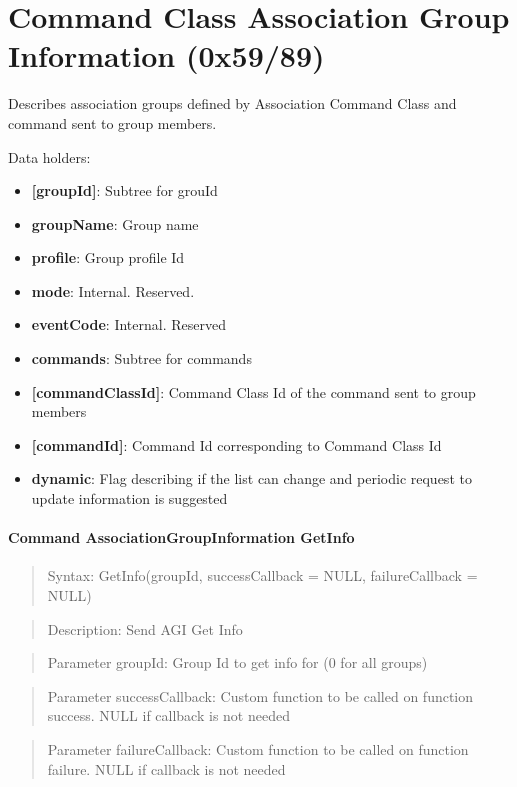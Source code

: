 \section{Command Class Association Group Information (0x59/89)}

Describes association groups defined by Association Command Class and command sent to group members.
\newline

\noindent
Data holders:

\begin{itemize}
\item \textbf{[groupId]}: Subtree for grouId
\item \qquad\textbf{groupName}: Group name
\item \qquad\textbf{profile}: Group profile Id
\item \qquad\textbf{mode}: Internal. Reserved.
\item \qquad\textbf{eventCode}: Internal. Reserved
\item \qquad\textbf{commands}: Subtree for commands
\item \qquad\qquad\textbf{[commandClassId]}: Command Class Id of the command sent to group members
\item \qquad\qquad\qquad\textbf{[commandId]}: Command Id corresponding to Command Class Id
\item \textbf{dynamic}: Flag describing if the list can change and periodic request to update information is suggested
\end{itemize}

\paragraph{Command AssociationGroupInformation GetInfo}
\begin{quote}Syntax: GetInfo(groupId, successCallback = NULL, failureCallback = NULL)\end{quote}
\begin{quote}Description: Send AGI Get Info\end{quote}
\begin{quote}Parameter groupId: Group Id to get info for (0 for all groups)\end{quote}
\begin{quote}Parameter successCallback: Custom function to be called on function success. NULL if callback is not needed\end{quote}
\begin{quote}Parameter failureCallback: Custom function to be called on function failure. NULL if callback is not needed\end{quote}


